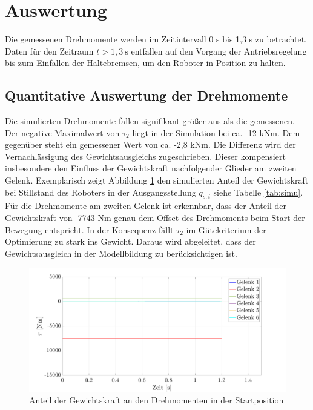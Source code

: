 \section{Auswertung}
Die gemessenen Drehmomente werden im Zeitintervall 0 s bis 1,3 s zu betrachtet. Daten für den Zeitraum $t>1,3~\text{s}$ entfallen auf den Vorgang der Antriebsregelung bis zum Einfallen der Haltebremsen, um den Roboter in Position zu halten. 
\subsection*{Quantitative Auswertung der Drehmomente}
Die simulierten Drehmomente fallen signifikant größer aus als die gemessenen. Der negative Maximalwert von $\tau_2$ liegt in der Simulation bei ca. -12 kNm. Dem gegenüber steht ein gemessener Wert  von ca. -2,8 kNm. Die Differenz wird der Vernachlässigung des Gewichtsausgleichs zugeschrieben. Dieser kompensiert insbesondere den Einfluss der Gewichtskraft nachfolgender Glieder am zweiten Gelenk. Exemplarisch zeigt Abbildung \ref{fig:gewichtskraft} den simulierten Anteil der Gewichtskraft bei Stillstand des Roboters in der Ausgangsstellung $q_{s,i}$ siehe Tabelle \ref{tab:simu}. Für die Drehmomente am zweiten Gelenk ist erkennbar, dass der Anteil der Gewichtskraft von -7743 Nm genau dem  Offset des Drehmoments beim Start der Bewegung entspricht. In der Konsequenz fällt $\tau_2$ im Gütekriterium der Optimierung zu stark ins Gewicht. Daraus wird abgeleitet, dass der Gewichtsausgleich in der Modellbildung zu berücksichtigen ist. 
%
\begin{figure}[tbph]
	\centering
	\includegraphics[width=1\linewidth]{images/Gewichtskraft}
	\caption{Anteil der Gewichtskraft an den Drehmomenten in der Startposition}
	\label{fig:gewichtskraft}
\end{figure}
%
